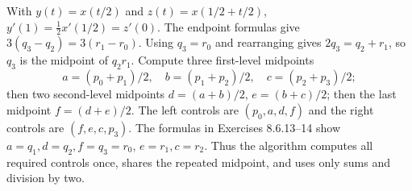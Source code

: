 With $y(t)=x(t/2)$ and $z(t)=x(1/2+t/2)$,
$y'(1)=\tfrac12x'(1/2)=z'(0)$.
The endpoint formulas give $3(q_3-q_2)=3(r_1-r_0)$.
Using $q_3=r_0$ and rearranging gives
$2q_3=q_2+r_1$, so $q_3$ is the midpoint of $q_2r_1$.
Compute three first-level midpoints
\[
 a=(p_0+p_1)/2,\quad b=(p_1+p_2)/2,\quad c=(p_2+p_3)/2;
\]
then two second-level midpoints $d=(a+b)/2$, $e=(b+c)/2$;
then the last midpoint $f=(d+e)/2$.
The left controls are $(p_0,a,d,f)$ and the right controls are $(f,e,c,p_3)$.
The formulas in Exercises 8.6.13--14 show $a=q_1,d=q_2,f=q_3=r_0$,
$e=r_1,c=r_2$. Thus the algorithm computes all required controls once,
shares the repeated midpoint, and uses only sums and division by two.
